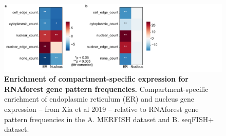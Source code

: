 \begin{figure}[h]
    \centering
    \includegraphics[width=\textwidth]{1_figures-and-files/FigS2.pdf}
    \caption[Enrichment of compartment-specific expression for RNAforest gene pattern frequencies.]{\textbf{Enrichment of compartment-specific expression for RNAforest gene pattern frequencies.} Compartment-specific enrichment of endoplasmic reticulum (ER) and nucleus gene expression – from Xia et al 2019\cite{xiaSpatialTranscriptomeProfiling2019} – relative to RNAforest gene pattern frequencies in the A. MERFISH dataset and B. seqFISH+ dataset. }\label{fig:supplement rnaforest enrichment}
\end{figure}
